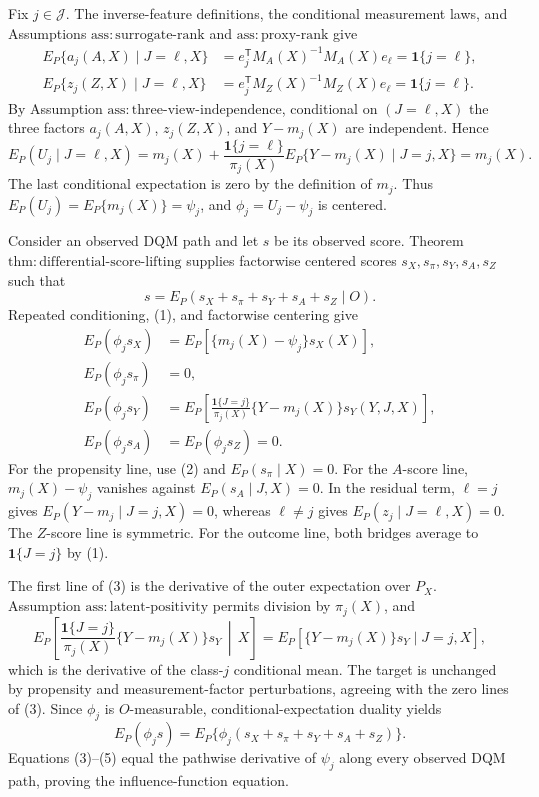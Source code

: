 Fix \(j\in\mathcal J\).  The inverse-feature definitions, the conditional measurement laws, and Assumptions \(\mathrm{ass{:}surrogate\mbox{-}rank}\) and \(\mathrm{ass{:}proxy\mbox{-}rank}\) give
\[
\begin{aligned}
 E_P\{a_j(A,X)\mid J=\ell,X\}
 &=e_j^{\mathsf T}M_A(X)^{-1}M_A(X)e_\ell
 =\mathbf 1\{j=\ell\},\\
 E_P\{z_j(Z,X)\mid J=\ell,X\}
 &=e_j^{\mathsf T}M_Z(X)^{-1}M_Z(X)e_\ell
 =\mathbf 1\{j=\ell\}. \tag{1}
\end{aligned}
\]
By Assumption \(\mathrm{ass{:}three\mbox{-}view\mbox{-}independence}\), conditional on \((J=\ell,X)\) the three factors \(a_j(A,X)\), \(z_j(Z,X)\), and \(Y-m_j(X)\) are independent.  Hence
\[
 E_P(U_j\mid J=\ell,X)
 =m_j(X)+\frac{\mathbf 1\{j=\ell\}}{\pi_j(X)}
 E_P\{Y-m_j(X)\mid J=j,X\}=m_j(X). \tag{2}
\]
The last conditional expectation is zero by the definition of \(m_j\).  Thus \(E_P(U_j)=E_P\{m_j(X)\}=\psi_j\), and \(\phi_j=U_j-\psi_j\) is centered.

Consider an observed DQM path and let \(s\) be its observed score.  Theorem \(\mathrm{thm{:}differential\mbox{-}score\mbox{-}lifting}\) supplies factorwise centered scores \(s_X,s_\pi,s_Y,s_A,s_Z\) such that
\[
s=E_P(s_X+s_\pi+s_Y+s_A+s_Z\mid O).
\]
Repeated conditioning, (1), and factorwise centering give
\[
\begin{aligned}
 E_P(\phi_js_X)&=E_P[\{m_j(X)-\psi_j\}s_X(X)],\\
 E_P(\phi_js_\pi)&=0,\\
 E_P(\phi_js_Y)&=E_P\!\left[
 \frac{\mathbf 1\{J=j\}}{\pi_j(X)}
 \{Y-m_j(X)\}s_Y(Y,J,X)\right],\\
 E_P(\phi_js_A)&=E_P(\phi_js_Z)=0. \tag{3}
\end{aligned}
\]
For the propensity line, use (2) and \(E_P(s_\pi\mid X)=0\).  For the \(A\)-score line, \(m_j(X)-\psi_j\) vanishes against \(E_P(s_A\mid J,X)=0\).  In the residual term, \(\ell=j\) gives \(E_P(Y-m_j\mid J=j,X)=0\), whereas \(\ell\ne j\) gives \(E_P(z_j\mid J=\ell,X)=0\).  The \(Z\)-score line is symmetric.  For the outcome line, both bridges average to \(\mathbf 1\{J=j\}\) by (1).

The first line of (3) is the derivative of the outer expectation over \(P_X\).  Assumption \(\mathrm{ass{:}latent\mbox{-}positivity}\) permits division by \(\pi_j(X)\), and
\[
 E_P\!\left[
 \frac{\mathbf 1\{J=j\}}{\pi_j(X)}
 \{Y-m_j(X)\}s_Y\,\middle|\,X\right]
 =E_P[\{Y-m_j(X)\}s_Y\mid J=j,X], \tag{4}
\]
which is the derivative of the class-\(j\) conditional mean.  The target is unchanged by propensity and measurement-factor perturbations, agreeing with the zero lines of (3).  Since \(\phi_j\) is \(O\)-measurable, conditional-expectation duality yields
\[
 E_P(\phi_js)
 =E_P\{\phi_j(s_X+s_\pi+s_Y+s_A+s_Z)\}. \tag{5}
\]
Equations (3)--(5) equal the pathwise derivative of \(\psi_j\) along every observed DQM path, proving the influence-function equation.

